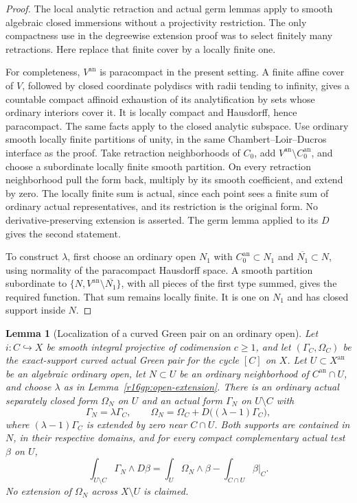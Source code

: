 \documentclass[11pt,a4paper]{article}
\newtheorem{lemma}[theorem]{Lemma}
\theoremstyle{definition}
\theoremstyle{remark}
\numberwithin{equation}{section}
\begin{document}
\begin{proof}
The local analytic retraction and actual germ lemmas apply
to smooth algebraic closed immersions without a projectivity
restriction.  The only compactness use in the degreewise
extension proof was to select finitely many retractions.  Here
replace that finite cover by a locally finite one.

For completeness, $V^{\mathrm{an}}$ is paracompact in the present
setting.  A finite affine cover of $V$, followed by closed coordinate
polydiscs with radii tending to infinity, gives a countable compact
affinoid exhaustion of its analytification by sets whose ordinary
interiors cover it.  It is locally compact and Hausdorff, hence
paracompact.  The same facts apply to the closed analytic subspace.
Use ordinary smooth locally finite partitions of unity, in the
same Chambert--Loir--Ducros interface as the proof.
Take retraction neighborhoods of $C_0$, add $V^{\mathrm{an}}\setminus
C_0^{\mathrm{an}}$, and choose a subordinate locally finite smooth
partition.  On every retraction neighborhood pull the form back,
multiply by its smooth coefficient, and extend by zero.  The
locally finite sum is actual, since each point sees a finite sum
of ordinary actual representatives, and its restriction is the
original form.  No derivative-preserving extension is asserted.
The germ lemma applied to its $D$ gives the second statement.

To construct $\lambda$, first choose an ordinary open $N_1$ with
$C_0^{\mathrm{an}}\subset N_1$ and $\overline{N_1}\subset N$,
using normality of the paracompact Hausdorff space.  A smooth
partition subordinate to $\{N,V^{\mathrm{an}}\setminus
\overline{N_1}\}$, with all pieces of the first type summed,
gives the required function.  That sum remains locally finite.
It is one on $N_1$ and has closed support inside $N$.
\end{proof}

\begin{lemma}[Localization of a curved Green pair on an ordinary open]
\label{r16gp:localized-pair}
Let $i:C\hookrightarrow X$ be smooth integral projective of
codimension $c\geq1$, and let $(\Gamma_C,\Omega_C)$ be the
exact-support curved actual Green pair for the cycle $[C]$ on $X$.
Let $U\subset X^{\mathrm{an}}$ be an algebraic ordinary open,
let $N\subset U$ be an ordinary neighborhood of $C^{\mathrm{an}}\cap U$,
and choose $\lambda$ as in Lemma~\ref{r16gp:open-extension}.
There is an ordinary actual separately closed form $\Omega_N$ on
$U$ and an actual form $\Gamma_N$ on $U\setminus C$ with
\[
 \Gamma_N=\lambda\Gamma_C,\qquad
 \Omega_N=\Omega_C+D\bigl((\lambda-1)\Gamma_C\bigr),
 \tag{GP16.1}\label{r16gp:local-pair}
\]
where $(\lambda-1)\Gamma_C$ is extended by zero near $C\cap U$.
Both supports are contained in $N$, in their respective domains,
and for every compact complementary actual test $\beta$ on $U$,
\[
 \int_{U\setminus C}\Gamma_N\wedge D\beta
   =\int_U\Omega_N\wedge\beta
                       -\int_{C\cap U}\beta|_C.
 \tag{GP16.2}\label{r16gp:local-green}
\]
No extension of $\Omega_N$ across $X\setminus U$ is claimed.
\end{lemma}
\end{document}
